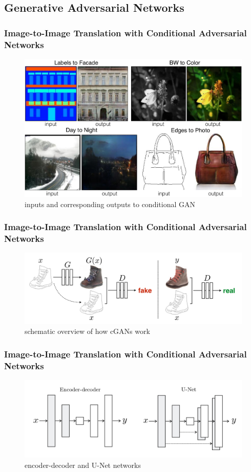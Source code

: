 \documentclass{beamer}
\begin{document}
\subsection{Generative Adversarial Networks}

\begin{frame}
\frametitle{Image-to-Image Translation with Conditional Adversarial Networks}
\cite{i2i}
\begin{figure}
	\includegraphics[width=0.6\linewidth]{../images/i2i.png}
	\caption{inputs and corresponding outputs to conditional GAN}
\end{figure}
\end{frame}

\begin{frame}
\frametitle{Image-to-Image Translation with Conditional Adversarial Networks}
\begin{figure}
	\includegraphics[width=\linewidth]{../images/i2i_GAN.png}
	\caption{schematic overview of how cGANs work}
\end{figure}
\end{frame}

\begin{frame}
\frametitle{Image-to-Image Translation with Conditional Adversarial Networks}
\begin{figure}
	\includegraphics[width=\linewidth]{../images/i2i_unet.png}
	\caption{encoder-decoder and U-Net networks}
\end{figure}
\end{frame}
\end{document}
